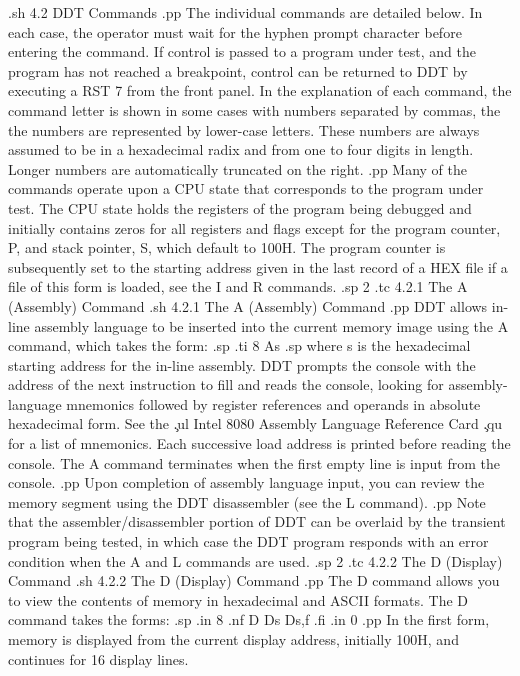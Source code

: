 .sh
4.2  DDT Commands
.pp
The individual commands are detailed below.  In each case, the 
operator must wait for the hyphen prompt character before entering 
the command.  If control is passed to a program under test, and 
the program has not reached a breakpoint, control can be returned 
to DDT by executing a RST 7 from the front panel.  In the 
explanation of each command, the command letter is shown in some 
cases with numbers separated by commas, the the numbers are 
represented by lower-case letters.  These numbers are always 
assumed to be in a hexadecimal radix and from one to four digits 
in length.  Longer numbers are automatically truncated on the 
right.
.pp
Many of the commands operate upon a CPU state that corresponds 
to the program under test.  The CPU state holds the registers of 
the program being debugged and initially contains zeros for all 
registers and flags except for the program counter, P, and stack 
pointer, S, which default to 100H.  The program counter is 
subsequently set to the starting address given in the last record 
of a HEX file if a file of this form is loaded, see the I and R 
commands.
.sp 2
.tc         4.2.1  The A (Assembly) Command
.sh
4.2.1  The A (Assembly) Command
.pp
DDT allows in-line assembly language to be inserted into the 
current memory image using the A command, which takes the form:
.sp
.ti 8
As
.sp
where s is the hexadecimal starting address for the in-line 
assembly.  DDT prompts the console with the address of the next 
instruction to fill and reads the console, looking for assembly-language 
mnemonics followed by register references and operands in 
absolute hexadecimal form.  See the \c
.ul
Intel 8080 Assembly Language Reference Card \c
.qu
for a list of mnemonics.  Each 
successive load address is printed before reading the console.  
The A command terminates when the first empty line is input from 
the console.
.pp
Upon completion of assembly language input, you can 
review the memory segment using the DDT disassembler (see the L 
command).
.pp
Note that the assembler/disassembler portion of 
DDT can be overlaid by the transient program being tested, in 
which case the DDT program responds with an error condition when 
the A and L commands are used.
.sp 2
.tc         4.2.2  The D (Display) Command
.sh
4.2.2  The D (Display) Command
.pp
The D command allows you to view the contents of memory 
in hexadecimal and ASCII formats.  The D command takes the forms:
.sp 
.in 8
.nf
D
Ds
Ds,f
.fi
.in 0
.pp 
In the first form, memory is displayed from the current display 
address, initially 100H, and continues for 16 display lines.  
